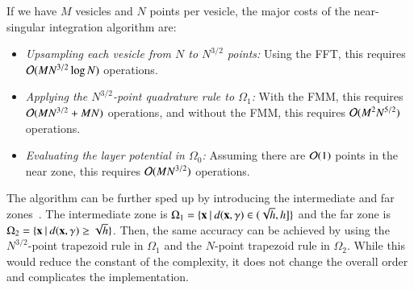 If we have $M$ vesicles and $N$ points per vesicle, the major costs of
the near-singular integration algorithm are:
\begin{itemize}
  \item \emph{Upsampling each vesicle from $N$ to $N^{3/2}$ points:}
  Using the FFT, this requires $\mathcal{O}(MN^{3/2}\log N)$ operations.
  \item \emph{Applying the $N^{3/2}$-point quadrature rule to
  $\Omega_{1}$:} With the FMM, this requires $\mathcal{O}(MN^{3/2} + MN)$
  operations, and without the FMM, this requires $\mathcal{O}(M^{2}N^{5/2})$
  operations.  
  \item \emph{Evaluating the layer potential in $\Omega_{0}$:} Assuming
  there are $\mathcal{O}(1)$ points in the near zone, this requires
  $\mathcal{O}(MN^{3/2})$ operations.
\end{itemize}
The algorithm can be further sped up by introducing the intermediate and
far zones~\cite{ying-biros-zorin06}.  The intermediate zone is
$\Omega_{1}=\{{\mathbf{x}} \:|\: d({\mathbf{x}},\gamma) \in (\sqrt{h},h]\}$ and the far
zone is $\Omega_{2}=\{{\mathbf{x}} \:|\: d({\mathbf{x}},\gamma) \geq \sqrt{h}\}$.  Then,
the same accuracy can be achieved by using the $N^{3/2}$-point trapezoid
rule in $\Omega_{1}$ and the $N$-point trapezoid rule in $\Omega_{2}$.
While this would reduce the constant of the complexity, it does not
change the overall order and complicates the implementation.


